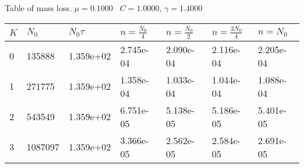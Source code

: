 \begin{center}
Table of mass loss. $\mu = 0.1000$ \, $C = 1.0000$, $\gamma = 1.4000$
  
\begin{tabular}{|p{0.8in}|p{0.8in}|p{0.8in}|p{0.8in}|p{0.8in}|p{0.8in}|p{0.8in}|} \hline
$K$ &$N_0$ &$N_0 \tau$ &$n = \frac{N_0}{4}$ &$n = \frac{N_0}{2}$ &$n = \frac{3N_0}{4}$ &$n = N_0$ \\ \hline 
0 &135888 &1.359e+02 &2.745e-04 &2.090e-04 &2.116e-04 &2.205e-04 \\ \hline 
1 &271775 &1.359e+02 &1.358e-04 &1.033e-04 &1.044e-04 &1.088e-04 \\ \hline 
2 &543549 &1.359e+02 &6.751e-05 &5.138e-05 &5.186e-05 &5.401e-05 \\ \hline 
3 &1087097 &1.359e+02 &3.366e-05 &2.562e-05 &2.584e-05 &2.691e-05 \\ \hline 

\end{tabular}\\[20pt]
\end{center}
